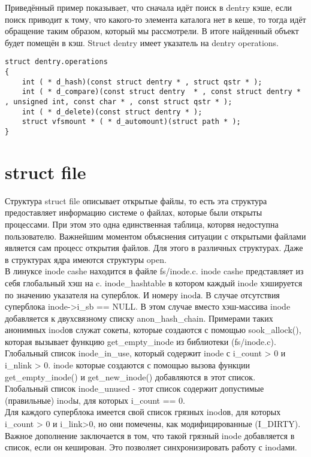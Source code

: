 Приведённый пример показывает, что сначала идёт поиск в dentry кэше, если поиск приводит к тому, что какого-то элемента каталога нет в кеше, то тогда идёт обращение таким образом, который мы рассмотрели. В итоге найденный объект будет помещён в кэш. Struct dentry имеет указатель на dentry operations.

\begin{lstlisting}
struct dentry.operations
{
	int ( * d_hash)(const struct dentry * , struct qstr * );
	int ( * d_compare)(const struct dentry  * , const struct dentry * , unsigned int, const char * , const struct qstr * );
	int ( * d_delete)(const struct dentry * );
	struct vfsmount * ( * d_automount)(struct path * );
}
\end{lstlisting}

\section{struct file}
Структура struct file описывает открытые файлы, то есть эта структура предоставляет информацию системе о файлах, которые были открыты процессами. При этом это одна единственная таблица, которвя недоступна пользователю. Важнейшим моментом объяснения ситуации с открытыми файлами является сам процесс открытия файлов. Для этого в различных структурах. Даже в структурах ядра имеются структуры open.\\

В линуксе inode cashe находится в файле fs/inode.c. inode cashe представляет из себя глобальный хэш на c. inode\_hashtable в котором каждый inode хэшируется по значению указателя на суперблок. И номеру inodа. В случае отсутствия суперблока inode->i\_sb == NULL. В этом случае вместо хэш-массива inode добавляется к двухсвязному списку anon\_hash\_chain. Примерами таких анонимных inodов служат сокеты, которые создаются с помощью sook\_allock(), которая вызывает функцию get\_empty\_inode из библиотеки (fs/inode.c).\\

Глобальный список inode\_in\_use, который содержит inode с i\_count > 0 и i\_nlink > 0. inode которые создаются с помощью вызова функции get\_empty\_inode() и get\_new\_inode() добавляются в этот список.\\

Глобальный список inode\_unused - этот список содержит допустимые (правильные) inodы, для которых i\_count == 0.\\

Для каждого суперблока имеется свой список грязных inodов, для которых i\_count > 0 и i\_link>0, но они помечены, как модифицированные (I\_DIRTY). Важное дополнение заключается в том, что такой грязный inode добавляется в список, если он кеширован. Это позволяет синхронизировать работу с inodами.\\


